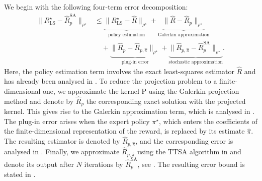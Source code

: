 \documentclass{article}
\theoremstyle{definition}
\theoremstyle{remark}
\theoremstyle{plain}
\newcommand{\MKQ}{\mathrm{P}}
\newcommand{\dsieve}{p}
\numberwithin{equation}{section}
\begin{document}
We begin with the following four-term error decomposition:
\begin{align}
\label{eq:four-term-decomposition}
    \|R_{\mathrm{LS}}^\star-\widehat R_{\dsieve}^{\mathrm{SA}}\|_{\rho^\star}
    &\leq
    \underbrace{
        \|R_{\mathrm{LS}}^\star-\widehat R\|_{\rho^\star}
    }_{\text{policy estimation}}
    +
    \underbrace{
        \|\widehat R-\widehat R_\dsieve\|_{\rho^\star}
    }_{\text{Galerkin approximation}}
    \\
    &\quad+
    \underbrace{
        \|\widehat R_\dsieve-\widehat R_{\dsieve,\widehat\pi}\|_{\rho^\star}
    }_{\text{plug-in error}}
    +
    \underbrace{
        \|\widehat R_{\dsieve,\widehat\pi}
        -\widehat R_{\dsieve}^{\mathrm{SA}}\|_{\rho^\star}
    }_{\text{stochastic approximation}}.
\end{align}
Here, the policy estimation term involves the exact least-squares estimator
\(\widehat R\) and has already been analysed in .
To reduce the projection problem to a finite-dimensional one, we approximate
the kernel \(\MKQ\) using the Galerkin projection method and denote by
\(\widehat R_{\dsieve}\) the corresponding exact solution with the projected
kernel. This gives rise to the Galerkin approximation term, which is analysed
in . The plug-in error arises when the
expert policy \(\pi^\star\), which enters the coefficients of the
finite-dimensional representation of the reward, is replaced by its estimate
\(\widehat\pi\). The resulting estimator is denoted by
\(\widehat R_{\dsieve,\widehat\pi}\), and the corresponding error is analysed
in . Finally, we approximate
\(\widehat R_{\dsieve,\widehat\pi}\) using the TTSA algorithm in  and denote
its output after \(N\) iterations by
\(\widehat R_{\dsieve}^{\mathrm{SA}}\), see . The resulting error bound is stated in
.
\end{document}
